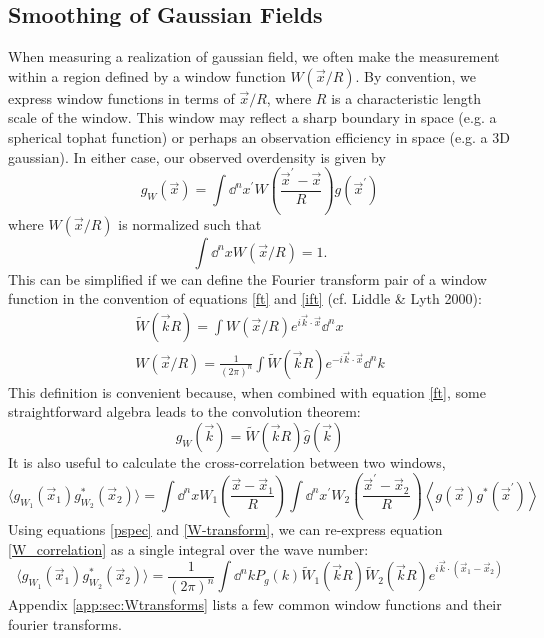 \subsection{Smoothing of Gaussian Fields}
\label{smoothing}
When measuring a realization of gaussian field, we often make the measurement
within a region defined by a window function $W(\vec x/R)$.
By convention, we express window functions in terms of $\vec x/R$,
where $R$ is a characteristic length scale of the window.
This window may reflect a sharp boundary in space (e.g. a spherical tophat 
function) or perhaps an observation efficiency in space (e.g. a 3D gaussian).
In either case, our observed overdensity is given by
\begin{equation}
  g_W(\vec x) = \int \dd^n x^\prime 
  W\left(\frac{\vec{x}^\prime-\vec{x}}{R}\right) g(\vec{x}^\prime)
\end{equation}
where $W(\vec x/R)$ is normalized such that
\begin{equation}
  \label{W_normalization}
  \int \dd^nx W(\vec{x}/R) = 1.
\end{equation}
This can be simplified if we can define the Fourier transform pair 
of a window function in the convention
of equations \ref{ft} and \ref{ift} (cf. Liddle \& Lyth 2000):
\begin{eqnarray}
  \label{W-transform}
  \widetilde{W}(\vec{k}R) = \int W(\vec{x}/R) e^{i\vec{k}\cdot\vec{x}}\dd^nx 
  \nonumber\\
  W(\vec{x}/R) = \frac{1}{(2\pi)^n}\int 
  \widetilde{W}(\vec{k}R) e^{-i\vec{k}\cdot\vec{x}}\dd^nk 
\end{eqnarray}
This definition is convenient because, when combined with equation \ref{ft},
some straightforward algebra leads to the convolution theorem:
\begin{equation}
  \hat g_W(\vec k) = \widetilde W(\vec k R)\hat g(\vec k)
\end{equation}
It is also useful to calculate the cross-correlation between two windows,
\begin{equation}
  \label{W_correlation}
  \langle g_{W_1}(\vec x_1)g^*_{W_2}(\vec x_2)\rangle = 
  \int \dd^n x 
  W_1\left(\frac{\vec{x}-\vec{x}_1}{R}\right) 
  \int \dd^n x^\prime 
  W_2\left(\frac{\vec{x}^\prime-\vec{x}_2}{R}\right) 
  \left\langle g(\vec{x})g^*(\vec{x}^\prime)  \right\rangle
\end{equation}
Using equations \ref{pspec} and \ref{W-transform}, we can re-express
equation \ref{W_correlation} as a single integral over the
wave number:
\begin{equation}
  \label{W_cov_simp}
  \langle g_{W_1}(\vec x_1)g^*_{W_2}(\vec x_2)\rangle = 
  \frac{1}{(2\pi)^n} \int \dd^nk
  P_g(k)\widetilde{W}_1(\vec{k}R)\widetilde{W}_2(\vec{k}R)
  e^{i\vec k\cdot(\vec x_1-\vec x_2)}
\end{equation}
Appendix \ref{app:sec:Wtransforms} lists a few common window functions and
their fourier transforms.

